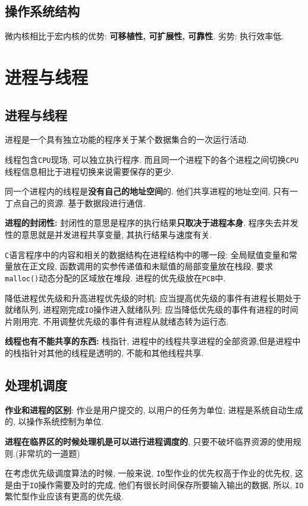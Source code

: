 \section{操作系统结构}
微内核相比于宏内核的优势: \textbf{可移植性, 可扩展性, 可靠性}. 劣势: 执行效率低.
\chapter{进程与线程}
\section{进程与线程}
进程是一个具有独立功能的程序关于某个数据集合的一次运行活动. \par \vspace{.5em}
线程包含\verb|CPU|现场, 可以独立执行程序. 而且同一个进程下的各个进程之间切换\verb|CPU|线程信息相比于进程切换来说需要保存的更少. \par \vspace{.5em}
同一个进程内的线程是\textbf{没有自己的地址空间}的. 他们共享进程的地址空间, 只有一丁点自己的资源. 基于数据段进行通信. \par \vspace{.5em}
\textbf{进程的封闭性:} 封闭性的意思是程序的执行结果\textbf{只取决于进程本身}. 程序失去并发性的意思就是并发进程共享变量, 其执行结果与速度有关.\par \vspace{.5em}
\verb|C|语言程序中的内容和相关的数据结构在进程结构中的哪一段: 全局赋值变量和常量放在正文段, 函数调用的实参传递值和未赋值的局部变量放在栈段, 要求\verb|malloc()|动态分配的区域放在堆段. 进程的优先级放在\verb|PCB|中. \par \vspace{.5em}
降低进程优先级和升高进程优先级的时机: 应当提高优先级的事件有进程长期处于就绪队列, 进程刚完成\verb|IO|操作进入就绪队列; 应当降低优先级的事件有进程的时间片刚用完. 不用调整优先级的事件有进程从就绪态转为运行态.\par \vspace{.5em}
\textbf{线程也有不能共享的东西:} 栈指针, 进程中的线程共享进程的全部资源,但是进程中的栈指针对其他的线程是透明的, 不能和其他线程共享.\par \vspace{.5em}
\section{处理机调度}
\textbf{作业和进程的区别}: 作业是用户提交的, 以用户的任务为单位; 进程是系统自动生成的, 以操作系统控制为单位.\par \vspace{.5em}
\textbf{进程在临界区的时候处理机是可以进行进程调度的}, 只要不破坏临界资源的使用规则.(非常坑的一道题)\par \vspace{.5em}
在考虑优先级调度算法的时候, 一般来说, \verb|IO|型作业的优先权高于作业的优先权, 这是由于\verb|IO|操作需要及时的完成, 他们有很长时间保存所要输入输出的数据, 所以, \verb|IO|繁忙型作业应该有更高的优先级.